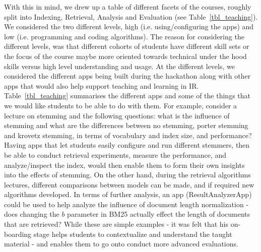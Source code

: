 With this in mind, we drew up a table of different facets of the courses, roughly split into Indexing, Retrieval, Analysis and Evaluation (see Table~\ref{tbl_teaching}). We considered the two different levels, high (i.e. using/configuring the apps) and low (i.e. programming and coding algorithms). The reason for considering the different levels, was that different cohorts of students have different skill sets or the focus of the course maybe more oriented towards technical under the hood skills versus high level understanding and usage. At the different levels, we considered the different apps being built during the hackathon along with other apps that would also help support teaching and learning in IR. Table~\ref{tbl_teaching} summarises the different apps and some of the things that we would like students to be able to do with them. For example, consider a lecture on stemming and the following questions: what is the influence of stemming and what are the differences between no stemming, porter stemming and krovetz stemming, in terms of vocabulary and index size, and performance? Having apps that let students easily configure and run different stemmers, then be able to conduct retrieval experiments, measure the performance, and analyze/inspect the index, would then enable them to form their own insights into the effects of stemming. On the other hand, during the retrieval algorithms lectures, different comparisons between models can be made, and if required new algorithms developed. In terms of further analysis, an app (ResultAnalyzerApp) could be used to help analyze the influence of document length normalization - does changing the $b$ parameter in BM25 actually effect the length of documents that are retrieved?
While these are simple examples - it was felt that his on-boarding stage helps students to contextualize and understand the taught material - and enables them to go onto conduct more advanced evaluations. 

